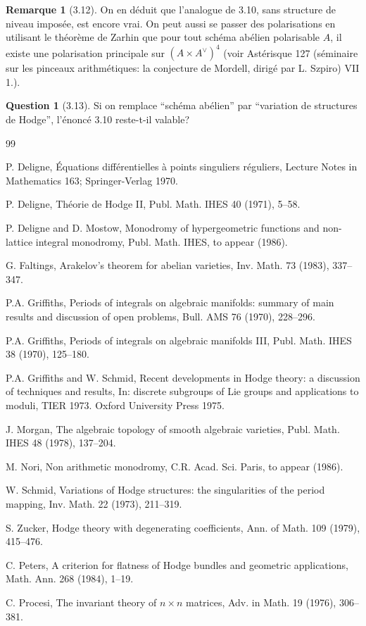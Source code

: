 \documentclass[12pt,a4paper]{article}
\theoremstyle{plain}
\theoremstyle{definition}
\newtheorem{remark}{Remarque}[section]
\newtheorem{question}{Question}[section]
\newcommand{\dual}{\vee}
\begin{document}
\begin{remark}[3.12]
On en d\'{e}duit que l'analogue de 3.10, sans structure de niveau impos\'{e}e, est encore vrai. On peut aussi se passer des polarisations en utilisant le th\'{e}or\`{e}me de Zarhin que pour tout sch\'{e}ma ab\'{e}lien polarisable $A$, il existe une polarisation principale sur $(A \times A^{\dual})^{4}$ (voir Ast\'{e}risque 127 (s\'{e}minaire sur les pinceaux arithm\'{e}tiques: la conjecture de Mordell, dirig\'{e} par L. Szpiro) VII 1.).
\end{remark}

\begin{question}[3.13]
Si on remplace ``sch\'{e}ma ab\'{e}lien'' par ``variation de structures de Hodge'', l'\'{e}nonc\'{e} 3.10 reste-t-il valable?
\end{question}

\begin{thebibliography}{99}

 P. Deligne, \'{E}quations diff\'{e}rentielles \`{a} points singuliers r\'{e}guliers, Lecture Notes in Mathematics 163; Springer-Verlag 1970.

 P. Deligne, Th\'{e}orie de Hodge II, Publ. Math. IHES 40 (1971), 5--58.

 P. Deligne and D. Mostow, Monodromy of hypergeometric functions and non-lattice integral monodromy, Publ. Math. IHES, to appear (1986).

 G. Faltings, Arakelov's theorem for abelian varieties, Inv. Math. 73 (1983), 337--347.

 P.A. Griffiths, Periods of integrals on algebraic manifolds: summary of main results and discussion of open problems, Bull. AMS 76 (1970), 228--296.

 P.A. Griffiths, Periods of integrals on algebraic manifolds III, Publ. Math. IHES 38 (1970), 125--180.

 P.A. Griffiths and W. Schmid, Recent developments in Hodge theory: a discussion of techniques and results, In: discrete subgroups of Lie groups and applications to moduli, TIER 1973. Oxford University Press 1975.

 J. Morgan, The algebraic topology of smooth algebraic varieties, Publ. Math. IHES 48 (1978), 137--204.

 M. Nori, Non arithmetic monodromy, C.R. Acad. Sci. Paris, to appear (1986).

 W. Schmid, Variations of Hodge structures: the singularities of the period mapping, Inv. Math. 22 (1973), 211--319.

 S. Zucker, Hodge theory with degenerating coefficients, Ann. of Math. 109 (1979), 415--476.

 C. Peters, A criterion for flatness of Hodge bundles and geometric applications, Math. Ann. 268 (1984), 1--19.

 C. Procesi, The invariant theory of $n \times n$ matrices, Adv. in Math. 19 (1976), 306--381.

\end{thebibliography}
\end{document}
